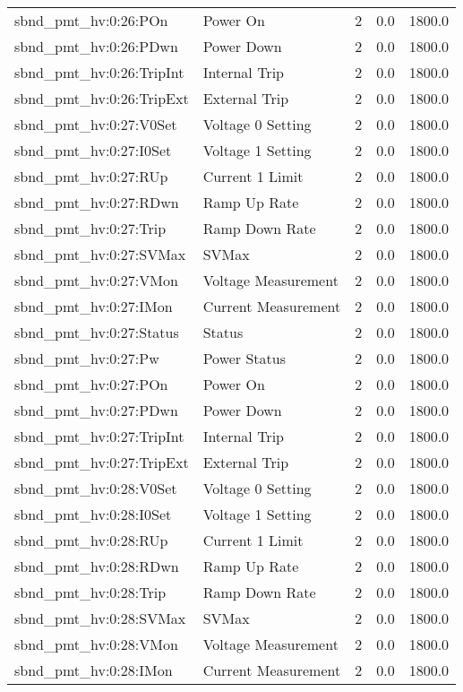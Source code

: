 \begin{center}
\begin{longtable}{l | l l l l }
sbnd\_pmt\_hv:0:26:POn & Power On & 2 & 0.0 & 1800.0\\ 
sbnd\_pmt\_hv:0:26:PDwn & Power Down & 2 & 0.0 & 1800.0\\ 
sbnd\_pmt\_hv:0:26:TripInt & Internal Trip & 2 & 0.0 & 1800.0\\ 
sbnd\_pmt\_hv:0:26:TripExt & External Trip & 2 & 0.0 & 1800.0\\ 
sbnd\_pmt\_hv:0:27:V0Set & Voltage 0 Setting & 2 & 0.0 & 1800.0\\ 
sbnd\_pmt\_hv:0:27:I0Set & Voltage 1 Setting & 2 & 0.0 & 1800.0\\ 
sbnd\_pmt\_hv:0:27:RUp & Current 1 Limit & 2 & 0.0 & 1800.0\\ 
sbnd\_pmt\_hv:0:27:RDwn & Ramp Up Rate & 2 & 0.0 & 1800.0\\ 
sbnd\_pmt\_hv:0:27:Trip & Ramp Down Rate & 2 & 0.0 & 1800.0\\ 
sbnd\_pmt\_hv:0:27:SVMax & SVMax & 2 & 0.0 & 1800.0\\ 
sbnd\_pmt\_hv:0:27:VMon & Voltage Measurement & 2 & 0.0 & 1800.0\\ 
sbnd\_pmt\_hv:0:27:IMon & Current Measurement & 2 & 0.0 & 1800.0\\ 
sbnd\_pmt\_hv:0:27:Status & Status & 2 & 0.0 & 1800.0\\ 
sbnd\_pmt\_hv:0:27:Pw & Power Status & 2 & 0.0 & 1800.0\\ 
sbnd\_pmt\_hv:0:27:POn & Power On & 2 & 0.0 & 1800.0\\ 
sbnd\_pmt\_hv:0:27:PDwn & Power Down & 2 & 0.0 & 1800.0\\ 
sbnd\_pmt\_hv:0:27:TripInt & Internal Trip & 2 & 0.0 & 1800.0\\ 
sbnd\_pmt\_hv:0:27:TripExt & External Trip & 2 & 0.0 & 1800.0\\ 
sbnd\_pmt\_hv:0:28:V0Set & Voltage 0 Setting & 2 & 0.0 & 1800.0\\ 
sbnd\_pmt\_hv:0:28:I0Set & Voltage 1 Setting & 2 & 0.0 & 1800.0\\ 
sbnd\_pmt\_hv:0:28:RUp & Current 1 Limit & 2 & 0.0 & 1800.0\\ 
sbnd\_pmt\_hv:0:28:RDwn & Ramp Up Rate & 2 & 0.0 & 1800.0\\ 
sbnd\_pmt\_hv:0:28:Trip & Ramp Down Rate & 2 & 0.0 & 1800.0\\ 
sbnd\_pmt\_hv:0:28:SVMax & SVMax & 2 & 0.0 & 1800.0\\ 
sbnd\_pmt\_hv:0:28:VMon & Voltage Measurement & 2 & 0.0 & 1800.0\\ 
sbnd\_pmt\_hv:0:28:IMon & Current Measurement & 2 & 0.0 & 1800.0\\ 

\end{longtable}
\end{center}
